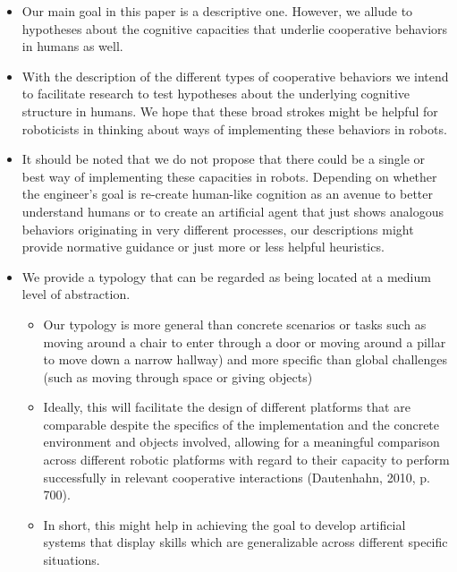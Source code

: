 \documentclass{article}
\begin{document}
\begin{itemize}
	\begin{itemize}

	\item Our main goal in this paper is a descriptive one. However, we allude
	to hypotheses about the cognitive capacities that underlie cooperative
	behaviors in humans as well. 

	\item With the description of the different types of cooperative behaviors
	we intend to facilitate research to test hypotheses about the underlying
	cognitive structure in humans. We hope that these broad strokes might be
	helpful for roboticists in thinking about ways of implementing these
	behaviors in robots.

	\item It should be noted that we do not propose that there could be a
	single or best way of implementing these capacities in robots. Depending on
	whether the engineer{}'s goal is re-create human-like cognition as an
	avenue to better understand humans or to create an artificial agent that
	just shows analogous behaviors originating in very different processes, our
	descriptions might provide normative guidance or just more or less helpful
	heuristics.

	\item We provide a typology that can be regarded as being located at a
	medium level of abstraction. 

		\begin{itemize}

		\item Our typology is more general than concrete scenarios or tasks
		such as moving around a chair to enter through a door or moving around
		a pillar to move down a narrow hallway) and more specific than global
		challenges (such as moving through space or giving objects)

		\item Ideally, this will facilitate the design of different platforms
		that are comparable despite the specifics of the implementation and the
		concrete environment and objects involved, allowing for a meaningful
		comparison across different robotic platforms with regard to their
		capacity to perform successfully in relevant cooperative interactions
		(Dautenhahn, 2010, p. 700).

		\item In short, this might help in achieving the goal to develop
		artificial systems that display skills which are generalizable across
		different specific situations.

		\end{itemize}

	\end{itemize}

\end{itemize}
\end{document}
